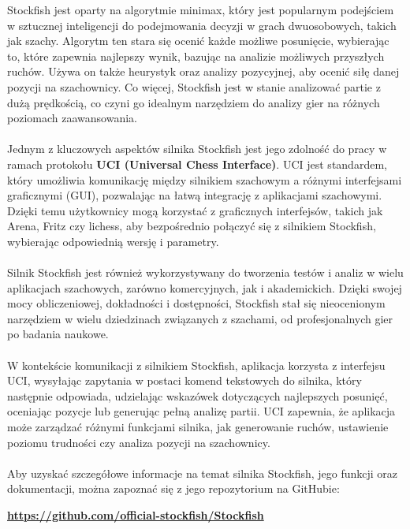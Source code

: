 \documentclass[12pt,a4paper]{article}
\begin{document}
\noindent
Stockfish jest oparty na algorytmie minimax, który jest popularnym podejściem w sztucznej inteligencji do podejmowania decyzji w grach dwuosobowych, takich jak szachy. Algorytm ten stara się ocenić każde możliwe posunięcie, wybierając to, które zapewnia najlepszy wynik, bazując na analizie możliwych przyszłych ruchów. Używa on także heurystyk oraz analizy pozycyjnej, aby ocenić siłę danej pozycji na szachownicy. Co więcej, Stockfish jest w stanie analizować partie z dużą prędkością, co czyni go idealnym narzędziem do analizy gier na różnych poziomach zaawansowania.
\\\\
Jednym z kluczowych aspektów silnika Stockfish jest jego zdolność do pracy w ramach protokołu \textbf{UCI (Universal Chess Interface)}. UCI jest standardem, który umożliwia komunikację między silnikiem szachowym a różnymi interfejsami graficznymi (GUI), pozwalając na łatwą integrację z aplikacjami szachowymi. Dzięki temu użytkownicy mogą korzystać z graficznych interfejsów, takich jak Arena, Fritz czy lichess, aby bezpośrednio połączyć się z silnikiem Stockfish, wybierając odpowiednią wersję i parametry.
\\\\
Silnik Stockfish jest również wykorzystywany do tworzenia testów i analiz w wielu aplikacjach szachowych, zarówno komercyjnych, jak i akademickich. Dzięki swojej mocy obliczeniowej, dokładności i dostępności, Stockfish stał się nieocenionym narzędziem w wielu dziedzinach związanych z szachami, od profesjonalnych gier po badania naukowe.
\\\\
W kontekście komunikacji z silnikiem Stockfish, aplikacja korzysta z interfejsu UCI, wysyłając zapytania w postaci komend tekstowych do silnika, który następnie odpowiada, udzielając wskazówek dotyczących najlepszych posunięć, oceniając pozycje lub generując pełną analizę partii. UCI zapewnia, że aplikacja może zarządzać różnymi funkcjami silnika, jak generowanie ruchów, ustawienie poziomu trudności czy analiza pozycji na szachownicy.
\\\\
Aby uzyskać szczegółowe informacje na temat silnika Stockfish, jego funkcji oraz dokumentacji, można zapoznać się z jego repozytorium na GitHubie: 

\begin{center}
    \textbf{\href{https://github.com/official-stockfish/Stockfish}{https://github.com/official-stockfish/Stockfish}}
\end{center}
\end{document}
